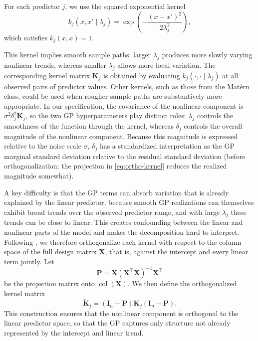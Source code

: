 \documentclass{article}
\begin{document}
For each predictor $j$, we use the squared exponential kernel
%
\begin{equation}
\label{eq:se-kernel}
k_j(x,x'\mid\lambda_j)
  = \exp\!\left(
      -\frac{(x-x')^2}{2\lambda_j^2}
    \right),
\end{equation}
%
which satisfies $k_j(x,x)=1$.
%

This kernel implies smooth sample paths: larger $\lambda_j$ produces
more slowly varying nonlinear trends, whereas smaller $\lambda_j$
allows more local variation.
The corresponding kernel matrix $\mathbf{K}_j$ is obtained by evaluating
$k_j(\cdot,\cdot\mid\lambda_j)$ at all observed pairs of predictor
values. Other kernels, such as those from the Mat\'ern class, could be
used when rougher sample paths are substantively more appropriate. In
our specification, the covariance of the nonlinear component is
$\sigma^2 \delta_j^2 \mathbf{K}_j$, so the two GP hyperparameters play
distinct roles: $\lambda_j$ controls the smoothness of the function
through the kernel, whereas $\delta_j$ controls the overall magnitude of
the nonlinear component. Because this magnitude is expressed relative to
the noise scale $\sigma$, $\delta_j$ has a standardized interpretation
as the GP marginal standard deviation relative to the residual standard
deviation (before orthogonalization; the projection in
\eqref{eq:ortho-kernel} reduces the realized magnitude somewhat).

A key difficulty is that the GP terms can absorb variation that is
already explained by the linear predictor, because smooth GP
realizations can themselves exhibit broad trends over the observed
predictor range, and with large $\lambda_j$ these trends can be close
to linear.
This creates confounding between the linear and nonlinear parts of the
model and makes the decomposition hard to interpret.
Following \textcite{PlumleeJoseph2018}, we therefore orthogonalize each
kernel with respect to the column space of the full design matrix
$\mathbf{X}$, that is, against the intercept and every linear term
jointly.
Let
%
\begin{equation}
\label{eq:projection}
\mathbf{P}
  = \mathbf{X}(\mathbf{X}^{\!\top}\mathbf{X})^{-1}\mathbf{X}^{\!\top}
\end{equation}
%
be the projection matrix onto $\operatorname{col}(\mathbf{X})$.
We then define the orthogonalized kernel matrix
%
\begin{equation}
\label{eq:ortho-kernel}
\widetilde{\mathbf{K}}_j
  = (\mathbf{I}_n-\mathbf{P})\mathbf{K}_j(\mathbf{I}_n-\mathbf{P}).
\end{equation}
%
This construction ensures that the nonlinear component is orthogonal
to the linear predictor space, so that the GP captures only structure
not already represented by the intercept and linear trend.
\end{document}
